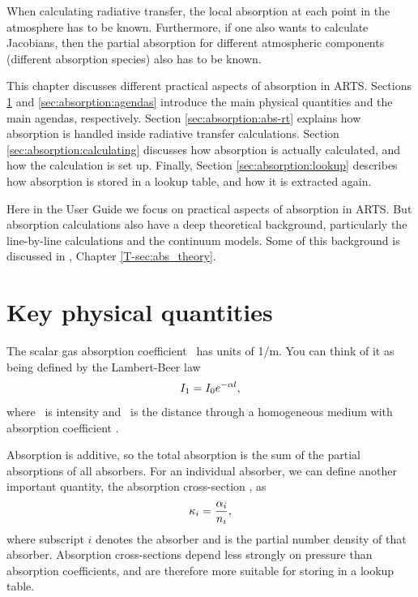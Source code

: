 When calculating radiative transfer, the local absorption 
at each point in the atmosphere has to be known.  Furthermore, if one
also wants to calculate Jacobians, then the partial absorption
for different atmospheric components (different
absorption species) also has to be known.   

This chapter discusses different practical aspects of absorption in
ARTS. Sections \ref{sec:absorption:quantities} and
\ref{sec:absorption:agendas} introduce the main physical quantities
and the main agendas, respectively. Section
\ref{sec:absorption:abs-rt} explains how absorption is handled inside
radiative transfer calculations.  Section
\ref{sec:absorption:calculating} discusses how absorption is actually
calculated, and how the calculation is set up.  Finally, Section
\ref{sec:absorption:lookup} describes how absorption is stored in a
lookup table, and how it is extracted again.

Here in the User Guide we focus on practical aspects of absorption in
ARTS.  But absorption calculations also have a deep theoretical
background, particularly the line-by-line calculations and the
continuum models.  Some of this background is discussed in \theory,
Chapter \ref{T-sec:abs_theory}. 


\section{Key physical quantities}
\label{sec:absorption:quantities}

The scalar gas absorption coefficient \AbsCoef\ has units of 1/m.  You
can think of it as being defined by the Lambert-Beer law
\begin{equation}
  I_1 = I_0 e^{-{\alpha} l},  
\end{equation}
where \Mpi\ is intensity and \PpathLng\ is the distance through a
homogeneous medium with absorption coefficient \AbsCoef.  

Absorption is additive, so the total absorption is the sum of the
partial absorptions of all absorbers.  For an individual absorber, we
can define another important quantity, the absorption cross-section
, as
\begin{equation}
  {\kappa}_{i} = \frac{{\alpha}_{i}}{{n}_{i}},
\end{equation}
where subscript $i$ denotes the absorber and  is the partial
number density of that absorber.  Absorption cross-sections depend
less strongly on pressure than absorption coefficients, and are
therefore more suitable for storing in a lookup table.

